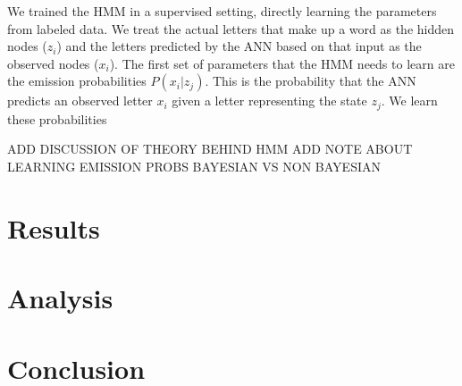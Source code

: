 \documentclass[11pt,a4paper,twocolumn]{article}
\begin{document}
We trained the HMM in a supervised setting, directly learning the parameters
from labeled data. We treat the actual letters that make up a word as the
hidden nodes ($z_i$) and the letters predicted by the ANN based on that
input as the observed nodes ($x_i$). The first set of parameters that the HMM
needs to learn are the emission probabilities $P(x_i | z_j)$. This is the probability
that the ANN predicts an observed letter $x_i$ given a letter representing
the state $z_j$. We learn these probabilities 

ADD DISCUSSION OF THEORY BEHIND HMM
ADD NOTE ABOUT LEARNING EMISSION PROBS BAYESIAN VS NON BAYESIAN


\section{Results}

\section{Analysis}

\section{Conclusion}



\end{document}
